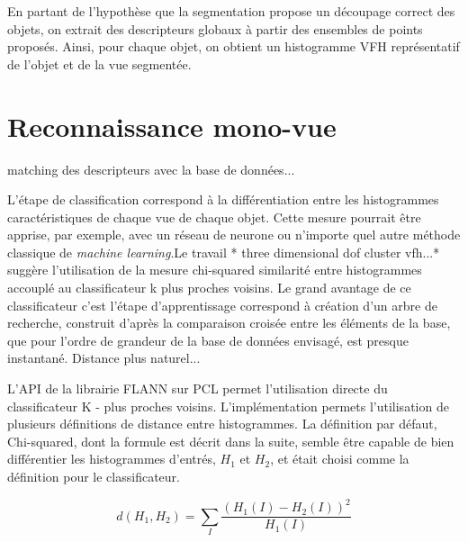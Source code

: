 En partant de l'hypothèse que la segmentation propose un découpage correct des objets, on extrait des descripteurs globaux à partir des ensembles de points proposés. Ainsi, pour chaque objet, on obtient un histogramme VFH représentatif de l'objet et de la vue segmentée.

\section {Reconnaissance mono-vue} 

matching des descripteurs avec la base de données...

L'étape de classification correspond à la différentiation entre les
histogrammes caractéristiques de chaque vue de chaque objet. Cette
mesure pourrait être apprise, par exemple, avec un réseau de neurone
ou n'importe quel autre méthode classique de \textit{machine learning}.{\color{green}Le travail * three dimensional
  dof cluster vfh...* suggère l'utilisation de la mesure chi-squared
  similarité entre histogrammes accouplé au classificateur k plus
  proches voisins. }  Le grand avantage de ce classificateur c'est l'étape
d’apprentissage correspond à création d’un arbre de recherche,
construit d'après la comparaison croisée entre les éléments de la base,
que pour l'ordre de grandeur de la base de données envisagé, est
presque instantané. Distance plus naturel...

L'API de la librairie FLANN sur PCL permet l'utilisation directe du classificateur
K - plus proches voisins. L'implémentation permets l'utilisation de plusieurs
définitions de distance entre histogrammes. La définition par défaut, Chi-squared,
dont la formule est décrit dans la suite, semble être capable de bien différentier
les histogrammes d'entrés, $H_1$ et $H_2$, et était choisi comme la définition pour le classificateur.

$$d(H_1, H_2) = \sum _I \frac{\left(H_1(I)-H_2(I)\right)^2}{H_1(I)} $$


